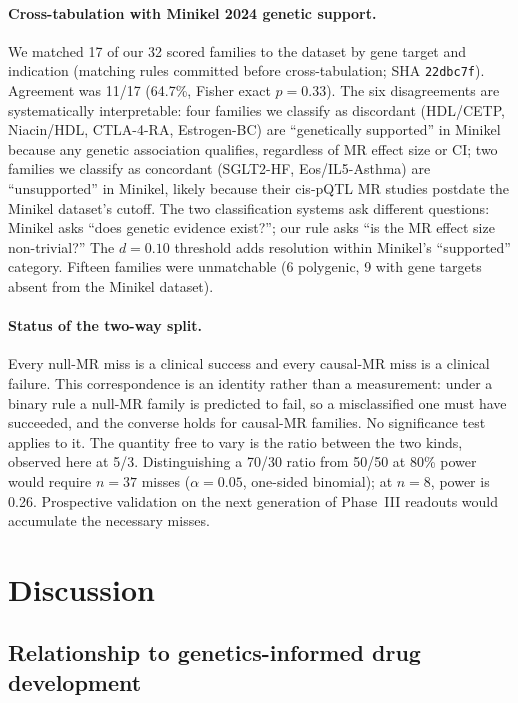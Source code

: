 \documentclass[11pt]{article}
\begin{document}
\paragraph{Cross-tabulation with Minikel 2024 genetic support.} We matched 17 of our 32 scored families to the \citet{minikel2024} dataset by gene target and indication (matching rules committed before cross-tabulation; SHA \texttt{22dbc7f}). Agreement was 11/17 (64.7\%, Fisher exact $p = 0.33$). The six disagreements are systematically interpretable: four families we classify as discordant (HDL/CETP, Niacin/HDL, CTLA-4-RA, Estrogen-BC) are ``genetically supported'' in Minikel because any genetic association qualifies, regardless of MR effect size or CI; two families we classify as concordant (SGLT2-HF, Eos/IL5-Asthma) are ``unsupported'' in Minikel, likely because their cis-pQTL MR studies postdate the Minikel dataset's cutoff. The two classification systems ask different questions: Minikel asks ``does genetic evidence exist?''; our rule asks ``is the MR effect size non-trivial?'' The $d = 0.10$ threshold adds resolution within Minikel's ``supported'' category. Fifteen families were unmatchable (6 polygenic, 9 with gene targets absent from the Minikel dataset).

\paragraph{Status of the two-way split.} Every null-MR miss is a clinical success and every causal-MR miss is a clinical failure. This correspondence is an identity rather than a measurement: under a binary rule a null-MR family is predicted to fail, so a misclassified one must have succeeded, and the converse holds for causal-MR families. No significance test applies to it. The quantity free to vary is the ratio between the two kinds, observed here at 5/3. Distinguishing a 70/30 ratio from 50/50 at 80\% power would require $n = 37$ misses ($\alpha = 0.05$, one-sided binomial); at $n = 8$, power is 0.26. Prospective validation on the next generation of Phase~III readouts would accumulate the necessary misses.

\section{Discussion}

\subsection{Relationship to genetics-informed drug development}
\end{document}
